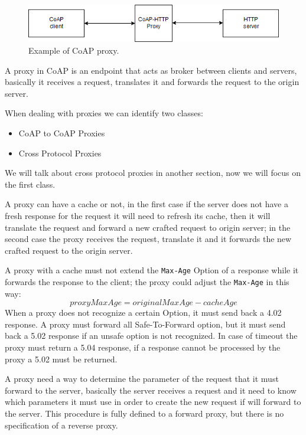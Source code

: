 	\begin{figure}
		\includegraphics[width=\linewidth]{coap-img1.png}
		\caption{Example of CoAP proxy.}
		\label{fig:coap1}
	\end{figure}

	A proxy in CoAP is an endpoint that acts as broker between clients and servers, basically it receives a request, translates it and forwards the request to the origin server.
	
	When dealing with proxies we can identify two classes:
	\begin{itemize}
		\item CoAP to CoAP Proxies
		\item Cross Protocol Proxies
	\end{itemize}
	
	We will talk about cross protocol proxies in another section, now we will focus on the first class.
	
	A proxy can have a cache or not, in the first case if the server does not have a fresh response for the request it will need to refresh its cache, then it will translate the request and forward a new crafted request to origin server; in the second case the proxy receives the request, translate it and it forwards the new crafted request to the origin server.
	
	A proxy with a cache must not extend the \texttt{Max-Age} Option of a response while it forwards the response to the client; the proxy could adjust the \texttt{Max-Age} in this way:
	\begin{equation}
		proxyMaxAge=originalMaxAge-cacheAge
	\end{equation}
	When a proxy does not recognize a certain Option, it must send back a 4.02 response.\newline
	A proxy must forward all Safe-To-Forward option, but it must send back a 5.02 response if an unsafe option is not recognized.\newline
	In case of timeout the proxy must return a 5.04 response, if a response cannot be processed by the proxy a 5.02 must be returned.\newline
	
	A proxy need a way to determine the parameter of the request that it must forward to the server, basically the server receives a request and it need to know which parameters it must use in order to create the new request if will forward to the server.\newline
	This procedure is fully defined to a forward proxy, but there is no specification of a reverse proxy.\newline
	
